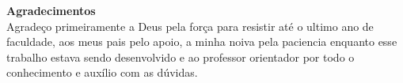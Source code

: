 \thispagestyle{empty}
\begin{center}
\end{center}

\begin{flushright}\footnotesize
\vspace{17cm}

\textbf{Agradecimentos} \\

Agradeço primeiramente a Deus pela força para resistir até o ultimo
ano de faculdade, aos meus pais pelo apoio, a minha noiva pela paciencia
enquanto esse trabalho estava sendo desenvolvido e ao professor
orientador por todo o conhecimento e auxílio com as dúvidas.
\end{flushright}
